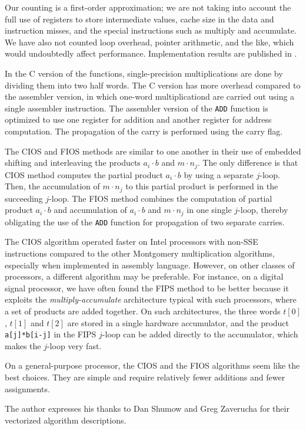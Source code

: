 \documentclass[twocolumn]{svjour3}          %
\begin{document}
Our counting is a first-order approximation; we are not
taking into account the full use of registers to store intermediate
values, cache size in the data and instruction misses, and the special
instructions such as multiply and accumulate.
We have also not counted loop overhead, pointer arithmetic, and the
like, which would undoubtedly affect performance.
Implementation results are published in \cite{KAK96:Analyzing}.


In the C version of the functions, single-precision multiplications
are done by dividing them into two half words.  The C version has more
overhead compared to the assembler version, in which one-word
multiplicationd are carried out using a single assembler instruction.
The assembler version of the {\tt ADD} function is optimized to use
one register for addition and another register for address
computation.  The propagation of the carry is performed using the
carry flag.

The CIOS and FIOS methods are similar to
one another in their use of embedded shifting and interleaving the
products $a_i\cdot b$ and $m\cdot n_j$. The only difference is that
CIOS method computes the partial product $a_i\cdot b$ by
using a separate $j$-loop. Then, the accumulation of $m\cdot n_j$ to
this partial product is performed in the succeeding $j$-loop.
The FIOS method combines the computation of partial
product $a_i\cdot b$ and accumulation of $a_i\cdot b$ and $m\cdot n_j$
in one single $j$-loop, thereby obligating the use of the {\tt ADD}
function for propagation of two separate carries.

The CIOS algorithm operated faster on Intel processors with non-SSE
instructions compared to the other Montgomery multiplication
algorithms, especially when implemented in assembly language. However,
on other classes of processors, a different algorithm may be
preferable.  For instance, on a digital signal processor, we have
often found the FIPS method to be better because it exploits the
\textit{multiply-accumulate} architecture typical with such processors,
where a set of products are added together. On such architectures, the
three words $t[0]$, $t[1]$ and $t[2]$ are stored in a single hardware
accumulator, and the product \texttt{a[j]*b[i-j]} in the FIPS $j$-loop
can be added directly to the accumulator, which makes the $j$-loop
very fast.

On a general-purpose processor, the CIOS and the FIOS algorithms seem
like the best choices. They are simple and require relatively fewer
additions and fewer assignments. 


\begin{acknowledgements}
The author expresses his thanks to Dan Shumow and Greg Zaverucha for their vectorized
algorithm descriptions.
\end{acknowledgements}


\end{document}
